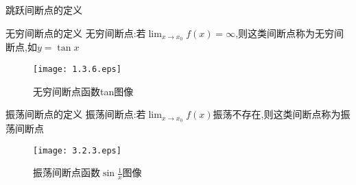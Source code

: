 \documentclass[8pt a4paper, oneside, UTF8]{ctexbook}
\begin{document}
\begin{sloppypar}
\begin{defn}{跳跃间断点的定义}{}
\begin{center}
        \end{center}
    \end{defn}
    \begin{defn}{无穷间断点的定义}{}
        无穷间断点:若$\lim_{x\to x_0}f(x)=\infty$,则这类间断点称为无穷间断点,如$y=\tan x$
              \begin{figure}[H]
                  \centering \texttt{[image: 1.3.6.eps]} \caption{无穷间断点函数tan图像}
              \end{figure}
    \end{defn}
    \begin{defn}{振荡间断点的定义}{}
        振荡间断点:若$\lim_{x\to x_0}f(x)$振荡不存在,则这类间断点称为振荡间断点
              \begin{figure}[H]
                  \centering \texttt{[image: 3.2.3.eps]} \caption{振荡间断点函数$\sin \frac{1}{x}$图像}
              \end{figure}
    \end{defn}    

\end{sloppypar}
\end{document}
